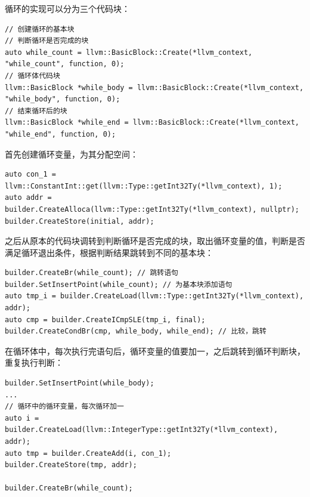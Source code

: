 \documentclass[lang=cn,11pt,a4paper,cite=authornum]{paper}
\begin{document}
循环的实现可以分为三个代码块：

\begin{code}
\begin{verbatim}
// 创建循环的基本块
// 判断循环是否完成的块
auto while_count = llvm::BasicBlock::Create(*llvm_context, "while_count", function, 0);
// 循环体代码块
llvm::BasicBlock *while_body = llvm::BasicBlock::Create(*llvm_context, "while_body", function, 0);
// 结束循环后的块
llvm::BasicBlock *while_end = llvm::BasicBlock::Create(*llvm_context, "while_end", function, 0);
\end{verbatim}
\end{code}

首先创建循环变量，为其分配空间：

\begin{code}
\begin{verbatim}
auto con_1 = llvm::ConstantInt::get(llvm::Type::getInt32Ty(*llvm_context), 1);
auto addr = builder.CreateAlloca(llvm::Type::getInt32Ty(*llvm_context), nullptr);
builder.CreateStore(initial, addr);
\end{verbatim}
\end{code}

之后从原本的代码块调转到判断循环是否完成的块，取出循环变量的值，判断是否满足循环退出条件，根据判断结果跳转到不同的基本块：

\begin{code}
\begin{verbatim}
builder.CreateBr(while_count); // 跳转语句
builder.SetInsertPoint(while_count); // 为基本块添加语句
auto tmp_i = builder.CreateLoad(llvm::Type::getInt32Ty(*llvm_context), addr);
auto cmp = builder.CreateICmpSLE(tmp_i, final);
builder.CreateCondBr(cmp, while_body, while_end); // 比较，跳转
\end{verbatim}
\end{code}

在循环体中，每次执行完语句后，循环变量的值要加一，之后跳转到循环判断块，重复执行判断：

\begin{code}
\begin{verbatim}
builder.SetInsertPoint(while_body);
...
// 循环中的循环变量，每次循环加一
auto i = builder.CreateLoad(llvm::IntegerType::getInt32Ty(*llvm_context), addr);
auto tmp = builder.CreateAdd(i, con_1);
builder.CreateStore(tmp, addr);

builder.CreateBr(while_count);
\end{verbatim}
\end{code}
\end{document}
